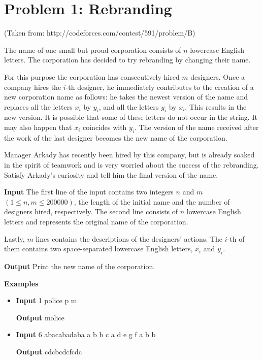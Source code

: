 \normalfont\documentclass[letterpaper,11pt]{article}
\begin{document}
\section*{Problem 1: Rebranding}
(Taken from: http://codeforces.com/contest/591/problem/B)

The name of one small but proud corporation consists of $n$ lowercase English letters. The corporation has decided to try rebranding by changing their name.

For this purpose the corporation has consecutively hired $m$ designers. Once a company hires the $i$-th designer, he immediately contributes to the creation of a new corporation name as follows: he takes the newest version of the name and replaces all the letters $x_i$ by $y_i$, and all the letters $y_i$ by $x_i$. This results in the new version. It is possible that some of these letters do not occur in the string. It may also happen that $x_i$ coincides with $y_i$. The version of the name received after the work of the last designer becomes the new name of the corporation.

Manager Arkady has recently been hired by this company, but is already soaked in the spirit of teamwork and is very worried about the success of the rebranding. Satisfy Arkady's curiosity and tell him the final version of the name.

\textbf{Input} \newline
The first line of the input contains two integers $n$ and $m$ $(1 \leq n, m \leq 200000)$, the length of the initial name and the number of designers hired, respectively. The second line consists of $n$ lowercase English letters and represents the original name of the corporation.

Lastly, $m$ lines contains the descriptions of the designers' actions. The $i$-th of them contains two space-separated lowercase English letters, $x_i$ and $y_i$.

\textbf{Output} \newline
Print the new name of the corporation.

\textbf{Examples}
\begin{itemize}
\item \textbf{Input}  1 \newline
police \newline
p m

\textbf{Output} \newline
molice

\item \textbf{Input}  6 \newline
abacabadaba \newline
a b \newline
b c \newline
a d \newline
e g \newline
f a \newline
b b

\textbf{Output} \newline
cdcbcdcfcdc
\end{itemize}
\end{document}
